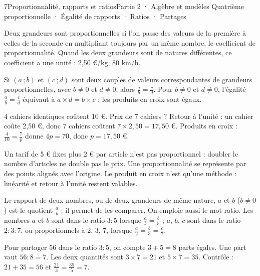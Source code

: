 \begin{ouverture}[courbe]{7}{Proportionnalité, rapports et ratios}{Partie 2 · Algèbre et modèles}
{Quatrième proportionnelle · Égalité de rapports · Ratios · Partages}
\end{ouverture}
\pagestyle{otMain}\essentiel\fontsize{11}{15}\selectfont
{}\label{cours-7-1}
\begin{definition}Deux grandeurs sont proportionnelles si l’on passe des valeurs de la première à celles de la seconde en multipliant toujours par un même nombre, le coefficient de proportionnalité. Quand les deux grandeurs sont de natures différentes, ce coefficient a une unité : 2,50 €/kg, 80 km/h.\end{definition}
\begin{propriete}Si $(a\,;b)$ et $(c\,;d)$ sont deux couples de valeurs correspondantes de grandeurs proportionnelles, avec $b\ne0$ et $d\ne0$, alors $\frac ab=\frac cd$. Pour $b\ne0$ et $d\ne0$, l’égalité $\frac ab=\frac cd$ équivaut à $a\times d=b\times c$ : les produits en croix sont égaux.\end{propriete}
\begin{exemple}4 cahiers identiques coûtent 10 €. Prix de 7 cahiers ? Retour à l’unité : un cahier coûte 2,50 €, donc 7 cahiers coûtent $7\times2{,}50=17{,}50$ €. Produits en croix : $\frac4{10}=\frac7p$ donne $4p=70$, donc $p=17{,}50$ €.\end{exemple}
\begin{attention}Un tarif de 5 € fixes plus 2 € par article n’est pas proportionnel : doubler le nombre d’articles ne double pas le prix. Une proportionnalité se représente par des points alignés avec l’origine. Le produit en croix n’est qu’une méthode : linéarité et retour à l’unité restent valables.\end{attention}
\clearpage
{}\label{cours-7-2}
\begin{definition}Le rapport de deux nombres, ou de deux grandeurs de même nature, $a$ et $b$ ($b\ne0$) est le quotient $\frac ab$ : il permet de les comparer. On emploie aussi le mot ratio. Les nombres $a$ et $b$ sont dans le ratio $3:5$ lorsque $\frac a3=\frac b5$ ; $a$, $b$, $c$ sont dans le ratio $2:3:7$, ou proportionnels à 2, 3, 7, lorsque $\frac a2=\frac b3=\frac c7$.\end{definition}
\begin{savoirfaire}Pour partager 56 dans le ratio $3:5$, on compte $3+5=8$ parts égales. Une part vaut $56:8=7$. Les deux quantités sont $3\times7=21$ et $5\times7=35$. Contrôle : $21+35=56$ et $\frac{21}3=\frac{35}5=7$.\end{savoirfaire}
\label{fig-cours-7-2-cours-ratio}

